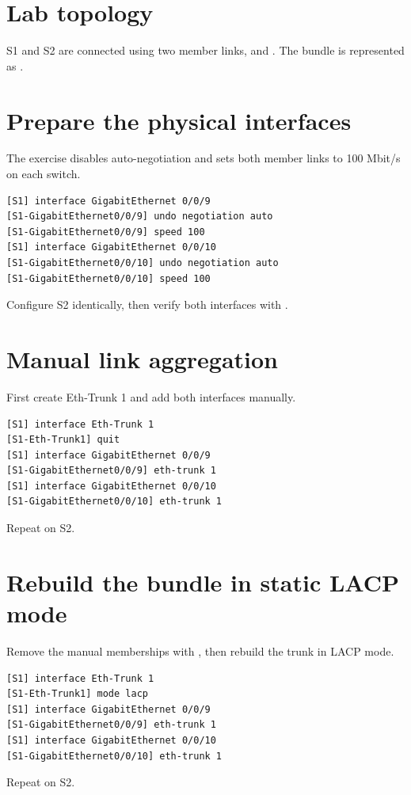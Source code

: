 \section{Lab topology}
S1 and S2 are connected using two member links,  and . The bundle is represented as .


\section{Prepare the physical interfaces}
The exercise disables auto-negotiation and sets both member links to 100 Mbit/s on each switch.
\begin{lstlisting}[style=dcnterminal]
[S1] interface GigabitEthernet 0/0/9
[S1-GigabitEthernet0/0/9] undo negotiation auto
[S1-GigabitEthernet0/0/9] speed 100
[S1] interface GigabitEthernet 0/0/10
[S1-GigabitEthernet0/0/10] undo negotiation auto
[S1-GigabitEthernet0/0/10] speed 100
\end{lstlisting}
Configure S2 identically, then verify both interfaces with .

\section{Manual link aggregation}
First create Eth-Trunk 1 and add both interfaces manually.
\begin{lstlisting}[style=dcnterminal]
[S1] interface Eth-Trunk 1
[S1-Eth-Trunk1] quit
[S1] interface GigabitEthernet 0/0/9
[S1-GigabitEthernet0/0/9] eth-trunk 1
[S1] interface GigabitEthernet 0/0/10
[S1-GigabitEthernet0/0/10] eth-trunk 1
\end{lstlisting}
Repeat on S2.

\section{Rebuild the bundle in static LACP mode}
Remove the manual memberships with , then rebuild the trunk in LACP mode.
\begin{lstlisting}[style=dcnterminal]
[S1] interface Eth-Trunk 1
[S1-Eth-Trunk1] mode lacp
[S1] interface GigabitEthernet 0/0/9
[S1-GigabitEthernet0/0/9] eth-trunk 1
[S1] interface GigabitEthernet 0/0/10
[S1-GigabitEthernet0/0/10] eth-trunk 1
\end{lstlisting}
Repeat on S2.

